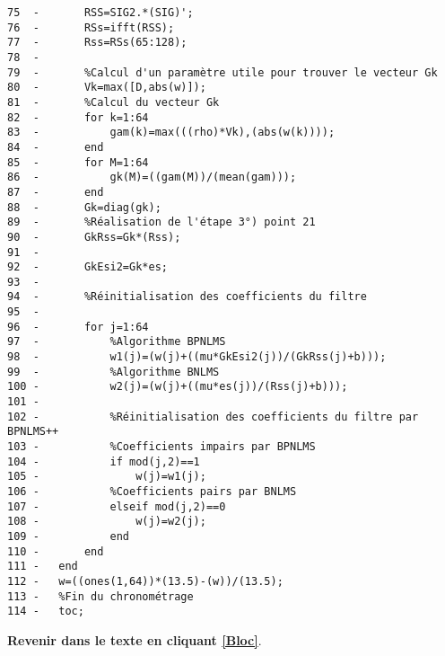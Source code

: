 \begin{verbatim}
75  -	    RSS=SIG2.*(SIG)';
76  -	    RSs=ifft(RSS);
77  -	    Rss=RSs(65:128);
78  -	    
79  -	    %Calcul d'un paramètre utile pour trouver le vecteur Gk
80  -	    Vk=max([D,abs(w)]);
81  -	    %Calcul du vecteur Gk
82  -	    for k=1:64
83  -	        gam(k)=max(((rho)*Vk),(abs(w(k))));
84  -	    end
85  -	    for M=1:64
86  -	        gk(M)=((gam(M))/(mean(gam)));
87  -	    end
88  -	    Gk=diag(gk);
89  -	    %Réalisation de l'étape 3°) point 21
90  -	    GkRss=Gk*(Rss);
91  -	    
92  -	    GkEsi2=Gk*es;
93  -	    
94  -	    %Réinitialisation des coefficients du filtre
95  -	    
96  -	    for j=1:64
97  -	        %Algorithme BPNLMS
98  -	        w1(j)=(w(j)+((mu*GkEsi2(j))/(GkRss(j)+b)));
99  -	        %Algorithme BNLMS
100 -	        w2(j)=(w(j)+((mu*es(j))/(Rss(j)+b)));
101 -	        
102 -	        %Réinitialisation des coefficients du filtre par BPNLMS++
103 -	        %Coefficients impairs par BPNLMS
104 -	        if mod(j,2)==1
105 -	            w(j)=w1(j);
106 -	        %Coefficients pairs par BNLMS    
107 -	        elseif mod(j,2)==0
108 -	            w(j)=w2(j);
109 -	        end
110 -	    end
111 -	end
112	-	w=((ones(1,64))*(13.5)-(w))/(13.5);
113 -	%Fin du chronométrage
114 -	toc;
\end{verbatim}
\textbf{Revenir dans le texte en cliquant \ref{Bloc}}.
